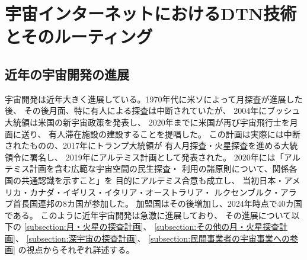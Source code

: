\chapter{宇宙インターネットにおけるDTN技術とそのルーティング}
\label{chap:prerequisite_knowledge}

\section{近年の宇宙開発の進展}
宇宙開発は近年大きく進展している。1970年代に米ソによって月探査が進展した後、
その後月面、特に有人による探査は中断されていたが、
2004年にブッシュ大統領は米国の新宇宙政策を発表し、
2020年までに米国が再び宇宙飛行士を月面に送り、
有人滞在施設の建設することを提唱した。\cite{久保田2009}
この計画は実際には中断されたものの、2017年にトランプ大統領が
有人月探査・火星探査を進める大統領令に署名し、
2019年にアルテミス計画として発表された。\cite{nasa2020}
2020年には「アルテミス計画を含む広範な宇宙空間の民生探査・
利用の諸原則について、関係各国の共通認識を示すこと」を
目的にアルテミス合意\cite{artemis_agreement1}も成立し、
当初日本・アメリカ・カナダ・イギリス・イタリア・オーストラリア・
ルクセンブルク・アラブ首長国連邦の8カ国が参加した。\cite{artemis_agreement2}
加盟国はその後増加し、2024年時点で40カ国である。\cite{artemis_agreement3}
このように近年宇宙開発は急激に進展しており、
その進展について以下の
\ref{subsection:月・火星の探査計画}、
\ref{subsection:その他の月・火星探査計画}、
\ref{subsection:深宇宙の探査計画}、
\ref{subsection:民間事業者の宇宙事業への参画}
の視点からそれぞれ詳述する。



